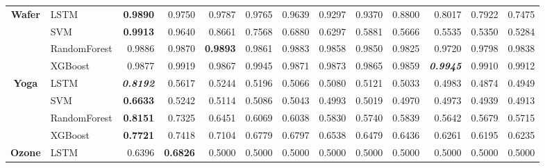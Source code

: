 \begin{table}[H]
\begin{adjustbox}{max width=14cm}
\begin{tabular}{|c|l|r|r|r|r|r|r|r|r|r|r|r|}
			\hline
			\textbf{Wafer}        & LSTM         & \textbf{0.9890}          & 0.9750                   & 0.9787          & 0.9765                   & 0.9639          & 0.9297 & 0.9370          & 0.8800                   & 0.8017                   & 0.7922          & 0.7475          \\
			                      & SVM          & \textbf{0.9913}          & 0.9640                   & 0.8661          & 0.7568                   & 0.6880          & 0.6297 & 0.5881          & 0.5666                   & 0.5535                   & 0.5350          & 0.5284          \\
			                      & RandomForest & 0.9886                   & 0.9870                   & \textbf{0.9893} & 0.9861                   & 0.9883          & 0.9858 & 0.9850          & 0.9825                   & 0.9720                   & 0.9798          & 0.9838          \\
			                      & XGBoost      & 0.9877                   & 0.9919                   & 0.9867          & 0.9945                   & 0.9871          & 0.9873 & 0.9865          & 0.9859                   & \textit{\textbf{0.9945}} & 0.9910          & 0.9912          \\
			\hline
			\textbf{Yoga}         & LSTM         & \textit{\textbf{0.8192}} & 0.5617                   & 0.5244          & 0.5196                   & 0.5066          & 0.5080 & 0.5121          & 0.5033                   & 0.4983                   & 0.4874          & 0.4949          \\
			                      & SVM          & \textbf{0.6633}          & 0.5242                   & 0.5114          & 0.5086                   & 0.5043          & 0.4993 & 0.5019          & 0.4970                   & 0.4973                   & 0.4939          & 0.4913          \\
			                      & RandomForest & \textbf{0.8151}          & 0.7325                   & 0.6451          & 0.6069                   & 0.6038          & 0.5830 & 0.5740          & 0.5839                   & 0.5642                   & 0.5679          & 0.5715          \\
			                      & XGBoost      & \textbf{0.7721}          & 0.7418                   & 0.7104          & 0.6779                   & 0.6797          & 0.6538 & 0.6479          & 0.6436                   & 0.6261                   & 0.6195          & 0.6235          \\
			\hline
			\textbf{Ozone}        & LSTM         & 0.6396                   & \textbf{0.6826}          & 0.5000          & 0.5000                   & 0.5000          & 0.5000 & 0.5000          & 0.5000                   & 0.5000                   & 0.5000          & 0.5000          \\

\end{tabular}
\end{adjustbox}
\end{table}
